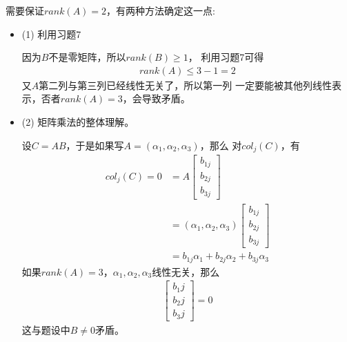 \documentclass{article}
\begin{document}
需要保证$rank(A) = 2$，有两种方法确定这一点:
\begin{itemize}
  \item (1) 利用习题7

        因为$B$不是零矩阵，所以$rank(B) \geq 1$，
        利用习题7可得
        \begin{align*}
          rank(A) \leq 3 - 1 = 2
        \end{align*}
        又$A$第二列与第三列已经线性无关了，所以第一列
        一定要能被其他列线性表示，否者$rank(A) = 3$，会导致矛盾。

  \item (2) 矩阵乘法的整体理解。

        设$C = AB$，于是如果写$A = (\alpha_1, \alpha_2, \alpha_3)$，那么
        对$col_j(C)$，有
        \begin{align*}
          col_j(C) = 0 & = A \begin{bmatrix}
                               b_{1j} \\
                               b_{2j} \\
                               b_{3j}
                             \end{bmatrix}                                 \\
                       & = (\alpha_1, \alpha_2, \alpha_3) \begin{bmatrix}
                                                            b_{1j} \\
                                                            b_{2j} \\
                                                            b_{3j}
                                                          \end{bmatrix}    \\
                       & = b_{1j}\alpha_1 + b_{2j}\alpha_2 + b_{3j}\alpha_3
        \end{align*}
        如果$rank(A) = 3$，$\alpha_1, \alpha_2, \alpha_3$线性无关，那么
        \begin{align*}
          \begin{bmatrix}
            b_1j \\
            b_2j \\
            b_3j
          \end{bmatrix} = 0
        \end{align*}
        这与题设中$B \neq 0$矛盾。
\end{itemize}
\end{document}
